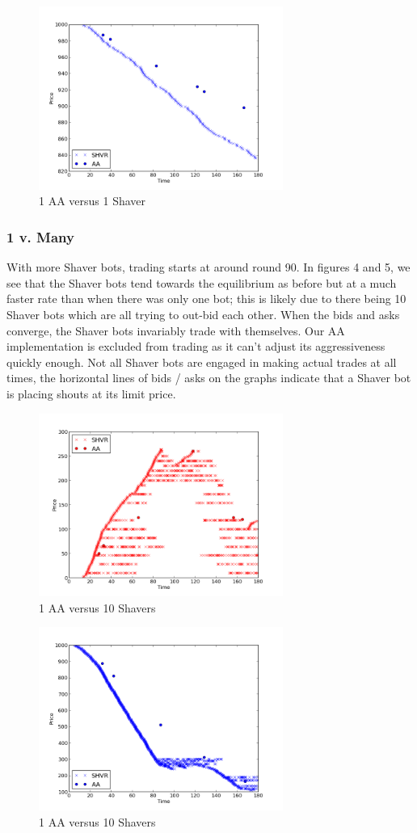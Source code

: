 \documentclass{acm_proc_article-sp}
\begin{document}
\begin{figure}[h!] \includegraphics[width=80mm]{SHVR1AA1_180_all_asks.png}
\caption {1 AA versus 1 Shaver}
\end{figure}

\subsubsection{1 v. Many} With more Shaver bots, trading starts at around round
90. In figures 4 and 5, we see that the Shaver bots tend towards the
equilibrium as before but at a much faster rate than when there was only one
bot; this is likely due to there being 10 Shaver bots which are all trying to
out-bid each other. When the bids and asks converge, the Shaver bots invariably
trade with themselves. Our AA implementation is excluded from trading as it
can't adjust its aggressiveness quickly enough. Not all Shaver bots are engaged
in making actual trades at all times, the horizontal lines of bids / asks on the
graphs indicate that a Shaver bot is placing shouts at its limit price.

\begin{figure}[h!] \includegraphics[width=80mm]{SHVR10AA1_180_all_bids.png}
\caption {1 AA versus 10 Shavers}
\end{figure}

\begin{figure}[h!] \includegraphics[width=80mm]{SHVR10AA1_180_all_asks.png}
\caption {1 AA versus 10 Shavers}
\end{figure}
\end{document}
